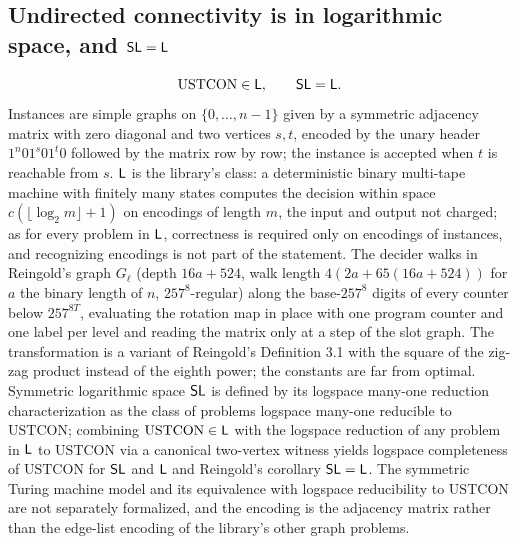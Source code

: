 \begin{result}
\subsection{Undirected connectivity is in logarithmic space, and $\mathsf{SL}=\mathsf{L}$}
\[\mathrm{USTCON}\in\mathsf{L},\qquad \mathsf{SL}=\mathsf{L}.\]
Instances are simple graphs on $\{0,\dots,n-1\}$ given by a symmetric adjacency matrix with zero
diagonal and two vertices $s,t$, encoded by the unary header $1^n01^s01^t0$ followed by the matrix
row by row; the instance is accepted when $t$ is reachable from $s$. $\mathsf{L}$ is the library's class:
a deterministic binary multi-tape machine with finitely many states computes the decision within
space $c(\lfloor\log_2 m\rfloor+1)$ on encodings of length $m$, the input and output not charged; as
for every problem in $\mathsf{L}$, correctness is required only on encodings of instances, and
recognizing encodings is not part of the statement. The decider walks in Reingold's graph $G_\ell$
(depth $16a+524$, walk length $4(2a+65(16a+524))$ for $a$ the binary length of $n$,
$257^8$-regular) along the base-$257^8$ digits of every counter below $257^{8T}$, evaluating the
rotation map in place with one program counter and one label per level and reading the matrix only
at a step of the slot graph. The transformation is a variant of Reingold's Definition 3.1 with the
square of the zig-zag product instead of the eighth power; the constants are far from optimal.
Symmetric logarithmic space $\mathsf{SL}$ is defined by its logspace many-one reduction
characterization as the class of problems logspace many-one reducible to $\mathrm{USTCON}$;
combining $\mathrm{USTCON}\in\mathsf{L}$ with the logspace reduction of any problem in $\mathsf{L}$ to
$\mathrm{USTCON}$ via a canonical two-vertex witness yields logspace completeness of
$\mathrm{USTCON}$ for $\mathsf{SL}$ and $\mathsf{L}$ and Reingold's corollary $\mathsf{SL}=\mathsf{L}$. The
symmetric Turing machine model and its equivalence with logspace reducibility to $\mathrm{USTCON}$
are not separately formalized, and the encoding is the adjacency matrix rather than the edge-list
encoding of the library's other graph problems.\citep{LewisPapadimitriou1982}\citep[Section 1, the proof of Lemma 3.4, and Theorems 4.1--4.2]{Reingold2008}\citep[Section 21.4]{AroraBarak09}

\end{result}
